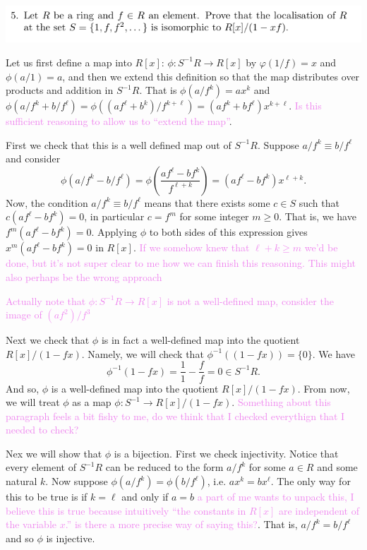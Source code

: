 \documentclass[12pt,letterpaper,boxed]{hmcpset}
\newcommand{\wg}[1]{\textcolor{violet}{#1}}
\newcommand{\inv}{^{-1}}
\begin{document}
\newpage

\begin{problem}
	\includegraphics[scale=0.8]{5.png}
	\hfill
\end{problem}

\begin{solution}
Let us first define a map into $R[x]$: $\phi: S\inv R \to R[x]$ by 
$\varphi(1/f) = x$ and $\phi(a/1) = a$, and then we extend this
definition so that the map distributes over products and addition in
$S\inv R$. That is $\phi(a/f^k) = ax^k$ and $\phi(a/f^k + b/f^\ell) =
\phi((af^\ell + b^k)/f^{k+\ell}) = (af^k + bf^\ell)x^{k+\ell}$. 
\wg{Is this sufficient reasoning to allow us to ``extend the map''}.

First we check that this is a well defined map out of $S\inv R$. 
Suppose $a/f^k \equiv b/f^\ell$ and consider
\[
	\phi(a/f^k - b/f^\ell) = \phi(\frac{af^\ell - bf^k}{f^{\ell+k}})
		= (af^\ell - bf^k)x^{\ell+k}.
\]
Now, the condition $a/f^k \equiv b/f^\ell$ means that there exists
some $c \in S$ such that $c(af^\ell - bf^k) = 0$, in particular $c =
f^m$ for some integer $m \geq 0$. That is, we have $f^m(af^\ell -
bf^k) = 0$. Applying $\phi$ to both sides of this expression gives
$x^m(af^\ell - bf^k) = 0$ in $R[x]$. \wg{If we somehow knew that $\ell
+ k \geq m$ we'd be done, but it's not super clear to me how we can
finish this reasoning. This might also perhaps be the wrong approach}

\wg{Actually note that $\phi: S\inv R \to R[x]$ is not a well-defined
map, consider the image of $(af^2)/f^3$}

Next we check that $\phi$ is in fact a well-defined map into the
quotient $R[x]/(1-fx)$. Namely, we will check that $\phi\inv((1-fx)) =
\{0\}$. We have \[
	\phi\inv(1-fx) = \frac{1}{1} - \frac{f}{f} = 0 \in S\inv R. 
\]
And so, $\phi$ is a well-defined map into the quotient $R[x]/(1-fx)$.
From now, we will treat $\phi$ as a map $\phi: S\inv \to R[x]/(1-fx)$.
\wg{Something about this paragraph feels a bit fishy to me, do we
think that I checked everythign that I needed to check?}

Nex we will show that $\phi$ is a bijection. First we check
injectivity. Notice that every element of $S\inv R$ can be reduced to
the form $a/f^k$ for some $a \in R$ and some natural $k$. Now suppose
$\phi(a/f^k) = \phi(b/f^\ell)$, i.e. $ax^k = bx^\ell$. The only way
for this to be true is if $k = \ell$ and only if $a = b$ \wg{a part of
me wants to unpack this, I believe this is true because intuitively
``the constants in $R[x]$ are independent of the variable $x$.'' is
there a more precise way of saying this?}.
That is, $a/f^k = b/f^\ell$ and so $\phi$ is injective.


\end{solution}
\end{document}
